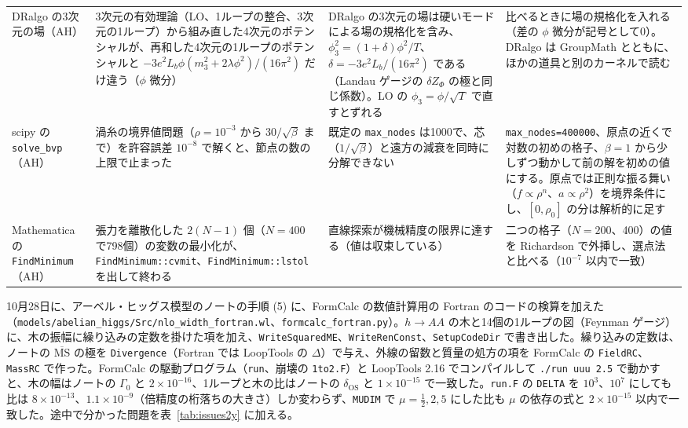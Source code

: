 \documentclass[a4paper,10pt]{ltjsarticle}
\begin{document}
\begin{table}[tbp]
\begin{tabularx}{\linewidth}{>{\raggedright\arraybackslash}p{2.4cm}>{\raggedright\arraybackslash}X>{\raggedright\arraybackslash}X>{\raggedright\arraybackslash}X}
DRalgo の3次元の場（AH） & 3次元の有効理論（LO、1ループの整合、3次元の1ループ）から組み直した4次元のポテンシャルが、再和した4次元の1ループのポテンシャルと $-3e^2L_b\phi(m_3^2+2\lambda\phi^2)/(16\pi^2)$ だけ違う（$\phi$ 微分） & DRalgo の3次元の場は硬いモードによる場の規格化を含み、$\phi_3^2=(1+\delta)\phi^2/T$、$\delta=-3e^2L_b/(16\pi^2)$ である（Landau ゲージの $\delta Z_\Phi$ の極と同じ係数）。LO の $\phi_3=\phi/\sqrt T$ で直すとずれる & 比べるときに場の規格化を入れる（差の $\phi$ 微分が記号として0）。DRalgo は GroupMath とともに、ほかの道具と別のカーネルで読む \\
scipy の \texttt{solve\_bvp}（AH） & 渦糸の境界値問題（$\rho=10^{-3}$ から $30/\sqrt\beta$ まで）を許容誤差 $10^{-8}$ で解くと、節点の数の上限で止まった & 既定の \texttt{max\_nodes} は1000で、芯（$1/\sqrt\beta$）と遠方の減衰を同時に分解できない & \texttt{max\_nodes=400000}、原点の近くで対数の初めの格子、$\beta=1$ から少しずつ動かして前の解を初めの値にする。原点では正則な振る舞い（$f\propto\rho^n$、$a\propto\rho^2$）を境界条件にし、$[0,\rho_0]$ の分は解析的に足す \\
Mathematica の \texttt{FindMinimum}（AH） & 張力を離散化した $2(N-1)$ 個（$N=400$ で798個）の変数の最小化が、\texttt{FindMinimum::cvmit}、\texttt{FindMinimum::lstol} を出して終わる & 直線探索が機械精度の限界に達する（値は収束している） & 二つの格子（$N=200$、400）の値を Richardson で外挿し、選点法と比べる（$10^{-7}$ 以内で一致） \\
\bottomrule
\end{tabularx}
\end{table}

10月28日に、アーベル・ヒッグス模型のノートの手順 (5) に、FormCalc の数値計算用の Fortran のコードの検算を加えた（\nolinkurl{models/abelian_higgs/Src/nlo_width_fortran.wl}、\nolinkurl{formcalc_fortran.py}）。$h\to AA$ の木と14個の1ループの図（Feynman ゲージ）に、木の振幅に繰り込みの定数を掛けた項を加え、\texttt{WriteSquaredME}、\texttt{WriteRenConst}、\texttt{SetupCodeDir} で書き出した。繰り込みの定数は、ノートの $\overline{\mathrm{MS}}$ の極を \texttt{Divergence}（Fortran では LoopTools の $\Delta$）で与え、外線の留数と質量の処方の項を FormCalc の \texttt{FieldRC}、\texttt{MassRC} で作った。FormCalc の駆動プログラム（\texttt{run}、崩壊の \texttt{1to2.F}）と LoopTools 2.16 でコンパイルして \texttt{./run uuu 2.5} で動かすと、木の幅はノートの $\Gamma_0$ と $2\times10^{-16}$、1ループと木の比はノートの $\delta_{\mathrm{OS}}$ と $1\times10^{-15}$ で一致した。\texttt{run.F} の \texttt{DELTA} を $10^3$、$10^7$ にしても比は $8\times10^{-13}$、$1.1\times10^{-9}$（倍精度の桁落ちの大きさ）しか変わらず、\texttt{MUDIM} で $\mu=\frac12,2,5$ にした比も $\mu$ の依存の式と $2\times10^{-15}$ 以内で一致した。途中で分かった問題を表~\ref{tab:issues2y} に加える。
\end{document}
